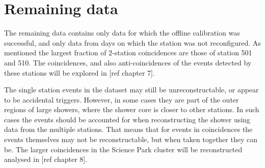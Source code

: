 \section{Remaining data}

The remaining data contains only data for which the offline calibration was successful, and only data from days on which the station was not reconfigured. As mentioned the largest fraction of 2-station coincidences are those of station 501 and 510. The coincidences, and also anti-coincidences of the events detected by these stations will be explored in [ref chapter 7].

The single station events in the dataset may still be unreconstructable, or appear to be accidental triggers. However, in some cases they are part of the outer regions of large showers, where the shower core is closer to other stations. In such cases the events should be accounted for when reconstructing the shower using data from the multiple stations. That means that for events in coincidences the events themselves may not be reconstructable, but when taken together they can be. The larger coincidences in the Science Park cluster will be reconstructed analysed in [ref chapter 8].
